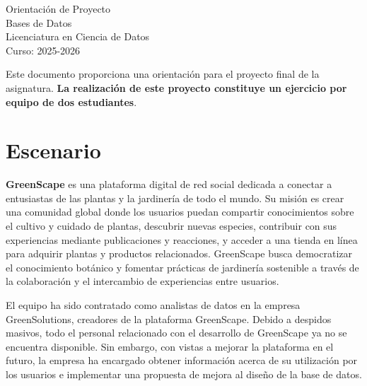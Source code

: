 \documentclass[10pt]{article}
\date{\displaydate{date}}
\begin{document}
	
	
	\begin{centering}
		
		\huge Orientación de Proyecto \\[2mm]
		
		\small Bases de Datos\\
		Licenciatura en Ciencia de Datos\\
		Curso: 2025-2026
		
	\end{centering}
	
	\vspace{2mm}
	
	Este documento proporciona una orientación para el proyecto final de la asignatura. \textbf{La realización de este proyecto constituye un ejercicio por equipo de dos estudiantes}.
	
	\section*{Escenario}
	
	\textbf{GreenScape} es una plataforma digital de red social dedicada a conectar a entusiastas de las plantas y la jardinería de todo el mundo. Su misión es crear una comunidad global donde los usuarios puedan compartir conocimientos sobre el cultivo y cuidado de plantas, descubrir nuevas especies, contribuir con sus experiencias mediante publicaciones y reacciones, y acceder a una tienda en línea para adquirir plantas y productos relacionados. GreenScape busca democratizar el conocimiento botánico y fomentar prácticas de jardinería sostenible a través de la colaboración y el intercambio de experiencias entre usuarios.
	
	El equipo ha sido contratado como analistas de datos en la empresa GreenSolutions, creadores de la plataforma GreenScape. Debido a despidos masivos, todo el personal relacionado con el desarrollo de GreenScape ya no se encuentra disponible. Sin embargo, con vistas a mejorar la plataforma en el futuro, la empresa ha encargado obtener información acerca de su utilización por los usuarios e implementar una propuesta de mejora al diseño de la base de datos.
	
\end{document}
